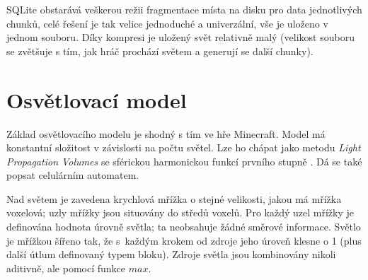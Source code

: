 
SQLite obstarává veškerou režii fragmentace místa na disku pro data jednotlivých chunků, celé řešení je tak velice jednoduché a univerzální, vše je uloženo v jednom souboru. Díky kompresi je uložený svět relativně malý (velikost souboru se zvětšuje s tím, jak hráč prochází světem a generují se další chunky).

\section{Osvětlovací model} \label{lightingModel}
Základ osvětlovacího modelu je shodný s tím ve hře Minecraft. Model má konstantní složitost v závislosti na počtu světel. Lze ho chápat jako metodu \textit{Light Propagation Volumes} se sférickou harmonickou funkcí prvního stupně \cite{MartinTimothyLy2012Holp}. Dá se také popsat celulárním automatem.

Nad světem je zavedena krychlová mřížka o stejné velikosti, jakou má mřížka voxelová; uzly mřížky jsou situovány do středů voxelů. Pro každý uzel mřížky je definována hodnota úrovně světla; ta neobsahuje žádné směrové informace. Světlo je mřížkou šířeno tak, že s~každým krokem od zdroje jeho úroveň klesne o 1 (plus další útlum definovaný typem bloku). Zdroje světla jsou kombinovány nikoli aditivně, ale pomocí funkce $max$.

